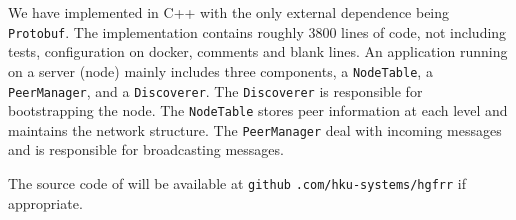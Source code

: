 We have implemented \xxx in C++ with the only external dependence being \texttt{Protobuf}. The \xxx implementation contains roughly 3800 lines of code, not including tests, configuration on docker, comments and blank lines. An \xxx application running on a server (node) mainly includes three components, a \texttt{NodeTable}, a \texttt{PeerManager}, and a \texttt{Discoverer}. The \texttt{Discoverer} is responsible for bootstrapping the node. The \texttt{NodeTable} stores peer information at each level and maintains the network structure. The \texttt{PeerManager} deal with incoming messages and is responsible for broadcasting messages.

The source code of \xxx will be available at \texttt{github} \texttt{.com/hku-systems/hgfrr} if appropriate.